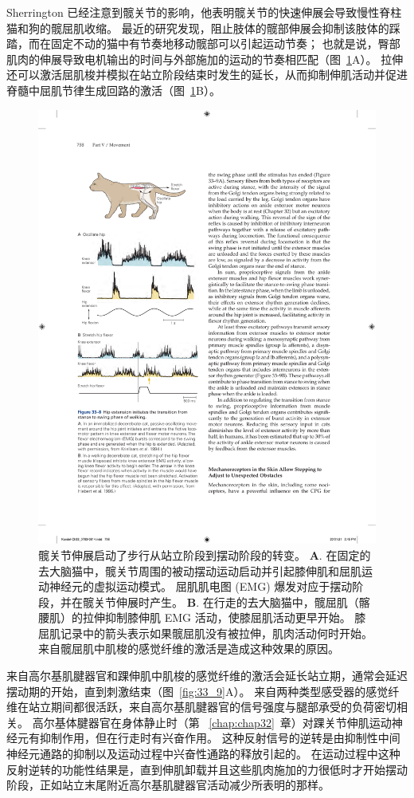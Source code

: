 Sherrington 已经注意到髋关节的影响，他表明髋关节的快速伸展会导致慢性脊柱猫和狗的髋屈肌收缩。
最近的研究发现，阻止肢体的髋部伸展会抑制该肢体的踩踏，而在固定不动的猫中有节奏地移动髋部可以引起运动节奏；
也就是说，臀部肌肉的伸展导致电机输出的时间与外部施加的运动的节奏相匹配（图~\ref{fig:33_8}A）。
拉伸还可以激活屈肌梭并模拟在站立阶段结束时发生的延长，从而抑制伸肌活动并促进脊髓中屈肌节律生成回路的激活（图~\ref{fig:33_8}B）。


\begin{figure}[htbp]
	\centering
	\includegraphics[width=0.5\linewidth]{chap33/fig_33_8}
	\caption{髋关节伸展启动了步行从站立阶段到摆动阶段的转变。
	\textbf{A}. 在固定的去大脑猫中，髋关节周围的被动摆动运动启动并引起膝伸肌和屈肌运动神经元的虚拟运动模式。
	屈肌肌电图 (EMG) 爆发对应于摆动阶段，并在髋关节伸展时产生\cite{kriellaars1994mechanical}。
	\textbf{B}. 在行走的去大脑猫中，髋屈肌（髂腰肌）的拉伸抑制膝伸肌 EMG 活动，使膝屈肌活动更早开始。 膝屈肌记录中的箭头表示如果髋屈肌没有被拉伸，肌肉活动何时开始。 来自髋屈肌中肌梭的感觉纤维的激活是造成这种效果的原因\cite{hiebert1996contribution}。}
	\label{fig:33_8}
\end{figure}


来自高尔基肌腱器官和踝伸肌中肌梭的感觉纤维的激活会延长站立期，通常会延迟摆动期的开始，直到刺激结束（图~\ref{fig:33_9}A）。
来自两种类型感受器的感觉纤维在站立期间都很活跃，来自高尔基肌腱器官的信号强度与腿部承受的负荷密切相关。
高尔基体腱器官在身体静止时（第 ~\ref{chap:chap32}~章）对踝关节伸肌运动神经元有抑制作用，但在行走时有兴奋作用。
这种反射信号的逆转是由抑制性中间神经元通路的抑制以及运动过程中兴奋性通路的释放引起的。
在运动过程中这种反射逆转的功能性结果是，直到伸肌卸载并且这些肌肉施加的力很低时才开始摆动阶段，正如站立末尾附近高尔基肌腱器官活动减少所表明的那样。


